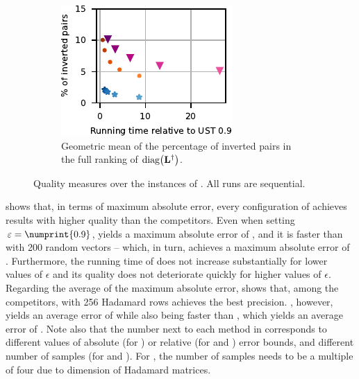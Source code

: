 \begin{figure}[tb]
\begin{subfigure}{.3\textwidth}
\centering
\includegraphics[width=\textwidth]{sources/plots/el-clos/full-ranking.pdf}
\caption{Geometric mean of the percentage of inverted pairs
in the full ranking of $\diag{\Linv}$.}
\label{fig:el-clos:el-clos-full-rank}
\end{subfigure}

\caption{Quality measures over the instances of .
All runs are sequential.}
\label{fig:el-clos:el-clos-quality}
\end{figure}

 shows that, in terms of maximum absolute error,
every configuration of \ust achieves results with higher quality than the competitors.
Even when setting $\epsilon = \numprint{0.9}$, \ust yields a maximum absolute
error of \ustMaxAbsErr, and it is \ustBekasSpeedup faster than \bekas with 200
random vectors -- which, in turn, achieves a maximum absolute error of \bekasMaxAbsErr.
Furthermore, the running time of \ust does not increase substantially for lower
values of $\epsilon$ and its quality does not deteriorate quickly for higher
values of $\epsilon$.
Regarding the average of the maximum absolute error,
 shows that, among the competitors, \bekash
with 256 Hadamard rows achieves the best precision. \ust, however, yields an
average error of \ustAvgAbsErr while also being \ustBekasHSpeedup faster than
\bekash, which yields an average error of \bekasAvgAbsErr. Note also that the
number next to each method in  corresponds to
different values of absolute (for \ust) or relative (for \lamgjlt and
\juliajlt) error bounds, and different number of samples (for \bekas and
\bekash). For \bekash, the number of samples needs to be a multiple of four due
to dimension of Hadamard matrices.

